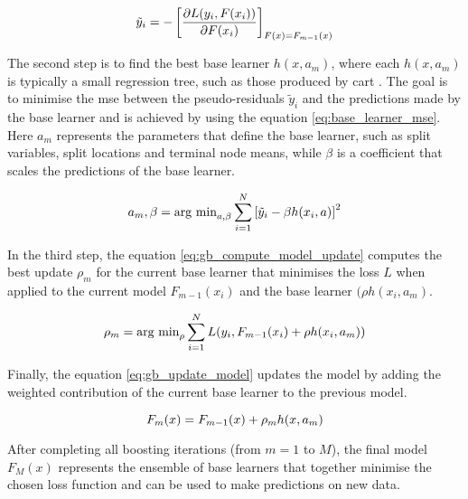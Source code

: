 \begin{equation}
    \centering
    \tilde{y}_i = - \left[\frac{\partial L(y_i, F(x_i))}{\partial F(x_i)} \right]_{F(x)=F_{m-1}(x)}
    \label{eq:computing_pseudo-residuals}
\end{equation}

\noindent
The second step is to find the best base learner $h(x, a_m)$, where each $h(x, a_m)$ is typically a small regression tree, such as those produced by \gls{cart} \citep{breiman1984classification}. The goal is to minimise the \gls{mse} between the pseudo-residuals $\tilde{y}_i$ and the predictions made by the base learner and is achieved by using the equation \ref{eq:base_learner_mse}. Here $a_m$ represents the parameters that define the base learner, such as split variables, split locations and terminal node means, while $\beta$ is a coefficient that scales the predictions of the base learner.

\begin{equation}
    \centering
    a_m, \beta = \text{arg min}_{a, \beta} \sum_{i=1}^N \left[\tilde{y}_i - \beta h(x_i, a)\right]^2
    \label{eq:base_learner_mse}
\end{equation}

\noindent
In the third step, the equation \ref{eq:gb_compute_model_update} computes the best update $\rho_m$ for the current base learner that minimises the loss $L$ when applied to the current model $F_{m-1}(x_i)$ and the base learner $(\rho h(x_i, a_m)$.

\begin{equation}
    \centering
    \rho_m = \text{arg min}_\rho \sum_{i=1}^N L(y_i, F_{m-1}(x_i) + \rho h(x_i, a_m))
    \label{eq:gb_compute_model_update}
\end{equation}

\noindent
Finally, the equation \ref{eq:gb_update_model} updates the model by adding the weighted contribution of the current base learner to the previous model.
 
\begin{equation}
    \centering
    F_m(x) = F_{m-1}(x) + \rho_m h(x, a_m)
    \label{eq:gb_update_model}
\end{equation}

\noindent
After completing all boosting iterations (from $m = 1$ to $M$), the final model $F_M(x)$ represents the ensemble of base learners that together minimise the chosen loss function and can be used to make predictions on new data.